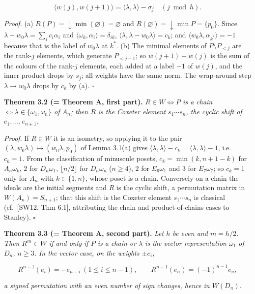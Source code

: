 \documentclass[
]{article}
\begin{document}
\[\langle w(j), w(j+1) \rangle = \langle \lambda, \lambda \rangle - \sigma_j \quad (j \bmod h).\]

\emph{Proof.} (a) \(R(P) = \downarrow\!\min(\varnothing) = \varnothing\)
and \(R(\varnothing) = \downarrow\!\min P = \{p_0\}\). Since
\(\lambda - w_0\lambda = \sum_i c_i\alpha_i\) and
\(\langle \omega_k, \alpha_i \rangle = \delta_{ik}\),
\(\langle \lambda, \lambda - w_0\lambda \rangle = c_k\); and
\(\langle w_0\lambda, \alpha_{k^*} \rangle = -1\) because that is the
label of \(w_0\lambda\) at \(k^*\). (b) The minimal elements of
\(P \setminus P_{<j}\) are the rank-\(j\) elements, which generate
\(P_{<j+1}\); so \(w(j+1) - w(j)\) is the sum of the colours of the
rank-\(j\) elements, each added at a label \(-1\) of \(w(j)\), and the
inner product drops by \(s_j\); all weights have the same norm. The
wrap-around step \(\lambda \to w_0\lambda\) drops by \(c_k\) by (a).
\(\square\)

\textbf{Theorem 3.2 (= Theorem A, first part).} \emph{\(R \in W \iff P\)
is a chain \(\iff \lambda \in \{\omega_1, \omega_n\}\) of \(A_n\); then
\(R\) is the Coxeter element \(s_1 \cdots s_n\), the cyclic shift of
\(e_1, \dots, e_{n+1}\).}

\emph{Proof.} If \(R \in W\) it is an isometry, so applying it to the
pair \((\lambda, w_0\lambda) \mapsto (w_0\lambda, p_0)\) of Lemma 3.1(a)
gives
\(\langle\lambda,\lambda\rangle - c_k = \langle\lambda,\lambda\rangle - 1\),
i.e.~\(c_k = 1\). From the classification of minuscule posets,
\(c_k = \min(k, n+1-k)\) for \(A_n\omega_k\), \(2\) for \(D_n\omega_1\),
\(\lfloor n/2 \rfloor\) for \(D_n\omega_n\) (\(n \ge 4\)), \(2\) for
\(E_6\omega_1\) and \(3\) for \(E_7\omega_7\); so \(c_k = 1\) only for
\(A_n\) with \(k \in \{1,n\}\), whose poset is a chain. Conversely on a
chain the ideals are the initial segments and \(R\) is the cyclic shift,
a permutation matrix in \(W(A_n) = S_{n+1}\); that this shift is the
Coxeter element \(s_1 \cdots s_n\) is classical (cf.~{[}SW12, Thm
6.1{]}, attributing the chain and product-of-chains cases to Stanley).
\(\square\)

\textbf{Theorem 3.3 (= Theorem A, second part).} \emph{Let \(h\) be even
and \(m = h/2\). Then \(R^m \in W\) if and only if \(P\) is a chain or
\(\lambda\) is the vector representation \(\omega_1\) of \(D_n\),
\(n \ge 3\). In the vector case, on the weights \(\pm e_i\),}

\[R^{n-1}(e_i) = -e_{n-i} \ (1 \le i \le n-1), \qquad R^{n-1}(e_n) = (-1)^{n-1} e_n,\]

\emph{a signed permutation with an even number of sign changes, hence in
\(W(D_n)\).}
\end{document}
